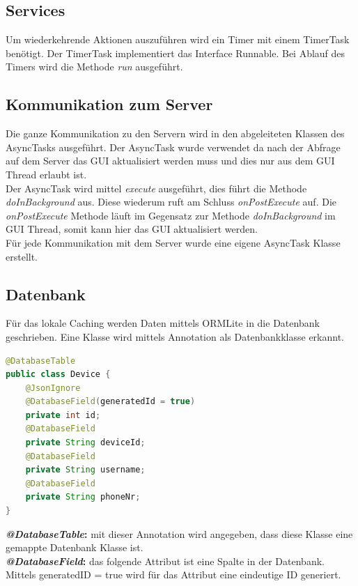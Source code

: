 \subsection{Services}
Um wiederkehrende Aktionen auszuführen wird ein Timer mit einem TimerTask benötigt. Der TimerTask implementiert das Interface Runnable. Bei Ablauf des Timers wird die Methode \textit{run} ausgeführt. 

\subsection{Kommunikation zum Server}
Die ganze Kommunikation zu den Servern wird in den abgeleiteten Klassen des AsyncTasks ausgeführt. Der AsyncTask wurde verwendet da nach der Abfrage auf dem Server das GUI aktualisiert werden muss und dies nur aus dem GUI Thread erlaubt ist. \\
Der AsyncTask wird mittel \textit{execute} ausgeführt, dies führt die Methode \textit{doInBackground} aus. Diese wiederum ruft am Schluss \textit{onPostExecute} auf. Die \textit{onPostExecute} Methode läuft im Gegensatz zur Methode \textit{doInBackground} im GUI Thread, somit kann hier das GUI aktualisiert werden.
\\Für jede Kommunikation mit dem Server wurde eine eigene AsyncTask Klasse erstellt.

\subsection{Datenbank}
Für das lokale Caching werden Daten mittels ORMLite in die Datenbank geschrieben. Eine Klasse wird mittels Annotation als Datenbankklasse erkannt.

\begin{lstlisting}[language=Java, caption=ORMLite Annotations]
@DatabaseTable
public class Device {
	@JsonIgnore
	@DatabaseField(generatedId = true)
	private int id;
	@DatabaseField
	private String deviceId;
	@DatabaseField
	private String username;
	@DatabaseField
	private String phoneNr;
}
\end{lstlisting}

\textbf{\textit{@DatabaseTable}:} mit dieser Annotation wird angegeben, dass diese Klasse eine gemappte Datenbank Klasse ist.\\
\textbf{\textit{@DatabaseField}:} das folgende Attribut ist eine Spalte in der Datenbank. Mittels generatedID = true wird für das Attribut eine eindeutige ID generiert.\\

